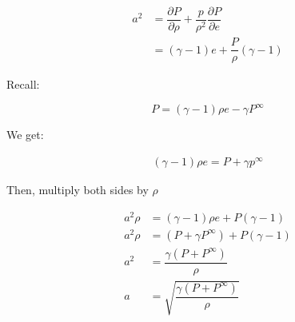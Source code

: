 \documentclass[12pt]{article}
\begin{document}
	\begin{align*}
		a^2 &= \dfrac{\partial P}{\partial \rho} + \dfrac{p}{\rho ^2}\dfrac{\partial P}{\partial e} \\
		&=(\gamma -1)e + \dfrac{P}{\rho}(\gamma -1)
	\end{align*}
	
	Recall:
	
	\begin{equation}
		P = (\gamma -1) \rho e - \gamma P^{\infty}
	\end{equation}
	
	We get: 
	
	\begin{align*}
		(\gamma -1)\rho e = P+\gamma p^{\infty}
	\end{align*}
	
	Then, multiply both sides by $\rho$
	
	\begin{align*}
		a^2 \rho &= (\gamma -1)\rho e + P(\gamma -1)\\
		a^2 \rho &= (P+ \gamma P^{\infty})+P(\gamma-1)\\
		a^2&=\dfrac{\gamma (P+P^{\infty}) }{\rho} \\
		a&=\sqrt{\dfrac{\gamma (P+P^{\infty}) }{\rho}}
	\end{align*}
	
	 
\end{document}
